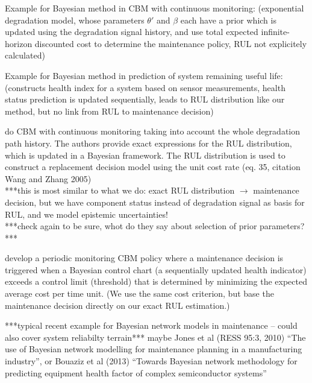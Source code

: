 \documentclass[authoryear]{elsarticle}
\begin{document}
Example for Bayesian method in CBM with continuous monitoring: \cite{2011:elwany-et-al}
(exponential degradation model, whose parameters $\theta'$ and $\beta$ each have a prior
which is updated using the degradation signal history,
and use total expected infinite-horizon discounted cost to determine the maintenance policy,
RUL not explicitely calculated)

Example for Bayesian method in prediction of system remaining useful life: \cite{2012:sun-et-al}
(constructs health index for a system based on sensor measurements,
health status prediction is updated sequentially,
leads to RUL distribution like our method,
but no link from RUL to maintenance decision)

\cite{2013:si-et-al} do CBM with continuous monitoring taking into account the whole degradation path history.
The authors provide exact expressions for the RUL distribution, which is updated in a Bayesian framework.
The RUL distribution is used to construct a replacement decision model using the unit cost rate
(eq. 35, citation Wang and Zhang 2005)\\
***this is most similar to what we do: exact RUL distribution $\to$ maintenance decision,
but we have component status instead of degradation signal as basis for RUL,
and we model epistemic uncertainties!\\
***check again to be sure, whot do they say about selection of prior parameters?***

\cite{2011:kim-et-al} develop a periodic monitoring CBM policy
where a maintenance decision is triggered when
a Bayesian control chart (a sequentially updated health indicator) %
exceeds a control limit (threshold) that is determined
by minimizing the expected average cost per time unit.
(We use the same cost criterion, but base the maintenance decision directly on our exact RUL estimation.)

***typical recent example for Bayesian network models in maintenance -- could also cover system reliabilty terrain***
maybe Jones et al (RESS 95:3, 2010) ``The use of Bayesian network modelling for maintenance planning in a manufacturing industry'',
or Bouaziz et al (2013) ``Towards Bayesian network methodology for predicting equipment health factor of complex semiconductor systems''
\end{document}
